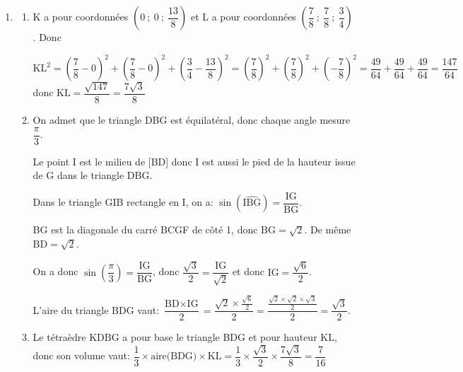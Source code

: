 \begin{enumerate}
\begin{enumerate}
Donc le point L est le projeté orthogonal du point K sur le plan (BDG).
	\end{enumerate}

\item 
	\begin{enumerate}
		\item%
K a pour coordonnées $\left(0~;~0~;~\dfrac{13}{8}\right)$ et L a pour coordonnées $\left(\dfrac78~;~\dfrac78~;~\dfrac34\right)$. Donc

$\text{KL}^2 = \left (\dfrac{7}{8}-0 \right )^2 + \left ( \dfrac{7}{8}-0 \right )^2 + \left ( \dfrac{3}{4} - \dfrac{13}{8}\right )^2
= \left (\dfrac{7}{8}\right )^2 + \left ( \dfrac{7}{8}\right )^2 + \left (  - \dfrac{7}{8}\right )^2
= \dfrac{49}{64} + \dfrac{49}{64} + \dfrac{49}{64}
= \dfrac{147}{64}$\\
donc $\text{KL} = \dfrac{\sqrt{147}}{8}=\dfrac{7\sqrt{3}}{8}$
		
		\item On admet que le triangle DBG est équilatéral, donc chaque angle mesure $\dfrac{\pi}{3}$.

Le point I est le milieu de [BD] donc I est aussi le pied de la hauteur issue de G dans le triangle DBG.

Dans le triangle GIB rectangle en I, on a:
$\sin \left ( \widehat{\text{IBG}} \right ) = \dfrac{\text{IG}}{\text{BG}}$.

BG est la diagonale du carré BCGF de côté 1, donc $\text{BG}=\sqrt{2}$.
De même $\text{BD}=\sqrt{2}$.
		
On a donc $\sin \left ( \dfrac{\pi}{3} \right ) = 	\dfrac{\text{IG}}{\text{BG}}$, donc $\dfrac{\sqrt{3}}{2}= \dfrac{\text{IG}}{\sqrt{2}}$ et donc $\text{IG} = \dfrac{\sqrt{6}}{2}$.

L'aire du triangle BDG vaut:
$\dfrac{\text{BD} \times \text{IG}}{2}=\dfrac{\sqrt{2}\times \frac{\sqrt{6}}{2}}{2}
= \dfrac{ \frac{\sqrt{2}\times \sqrt{2} \times \sqrt{3}}{2}}{2}= \dfrac{\sqrt{3}}{2}$.
		
		\item Le tétraèdre KDBG a pour base le triangle BDG et pour hauteur KL, donc son volume vaut:	
$\dfrac{1}{3}\times \text{aire(BDG)}\times \text{KL}
= \dfrac{1}{3}\times \dfrac{\sqrt{3}}{2}\times \dfrac{7\sqrt{3}}{8}
= \dfrac{7}{16}$		



\end{enumerate}
\end{enumerate}
